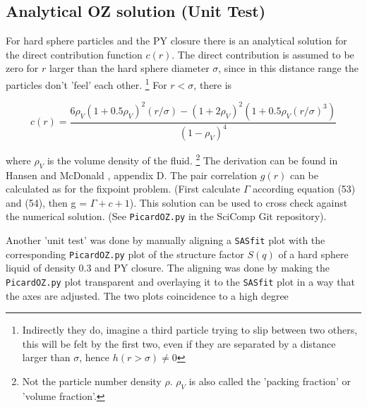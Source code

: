 \documentclass[11pt,a4paper]{article}
\begin{document}
\subsection{Analytical OZ solution (Unit Test)}
For hard sphere particles and the PY closure there is an analytical solution for the direct contribution function
$c(r)$. The direct contribution is assumed to be zero for $r$ larger than the hard sphere diameter
$\sigma$, since in this distance range the particles don't 'feel' each other. 
\footnote{Indirectly they do, imagine a third particle trying to slip between two others, this will be felt by the
first two, even if they are separated by a distance larger than $ \sigma$, hence $h(r > \sigma) \ne 0$}
For $r < \sigma$, there is

\begin{equation}
c(r) =
\frac{
6 \rho_V (1 + 0.5\rho_V)^2 (r/\sigma) - (1 + 2\rho_V)^2 (1 + 0.5\rho_V(r/\sigma)^3) 
}
{ (1 - \rho_V)^4 }
\end{equation}

where $\rho_V$ is the volume density of the fluid. \footnote{Not the particle number density $\rho$. $\rho_V$ is also called the 'packing fraction' or
'volume fraction'.}
The derivation can be found in Hansen and McDonald \cite{hansen2006theory}, appendix D. The pair correlation $g(r)$ can be calculated as for the fixpoint
problem. (First calculate $\Gamma$ according equation (53) and (54), then g = $\Gamma + c +1$). \newline
This solution can be used to cross check against the numerical solution. (See \texttt{PicardOZ.py} in the SciComp Git repository).

\newpage
Another 'unit test' was done by manually aligning a \texttt{SASfit} plot with the corresponding \texttt{PicardOZ.py} plot
of the structure factor $S(q)$ of a hard sphere liquid of density 0.3 and PY closure. The aligning was done by making 
the \texttt{PicardOZ.py} plot transparent and overlaying it to the \texttt{SASfit} plot in a way that the axes are adjusted. 
The two plots coincidence to a high degree
\end{document}
